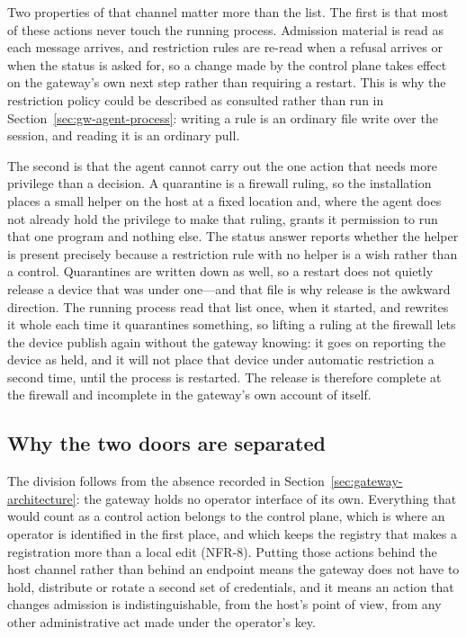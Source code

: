 \documentclass[12pt,a4paper]{report}
\begin{document}
Two properties of that channel matter more than the list. The first is
that most of these actions never touch the running process. Admission
material is read as each message arrives, and restriction rules are
re-read when a refusal arrives or when the status is asked for, so a
change made by the control plane takes effect on the gateway's own next
step rather than requiring a restart. This is why the restriction policy
could be described as consulted rather than run in
Section~\ref{sec:gw-agent-process}: writing a rule is an ordinary file
write over the session, and reading it is an ordinary pull.

The second is that the agent cannot carry out the one action that needs
more privilege than a decision. A quarantine is a firewall ruling, so
the installation places a small helper on the host at a fixed location
and, where the agent does not already hold the privilege to make that
ruling, grants it permission to run that one program and nothing else.
The status answer reports whether the helper is present precisely
because a restriction rule with no helper is a wish rather than a
control. Quarantines are written down as well, so a restart does not
quietly release a device that was under one---and that file is why
release is the awkward direction. The running process read that list
once, when it started, and rewrites it whole each time it quarantines
something, so lifting a ruling at the firewall lets the device publish
again without the gateway knowing: it goes on reporting the device as
held, and it will not place that device under automatic restriction a
second time, until the process is restarted. The release is therefore
complete at the firewall and incomplete in the gateway's own account of
itself.

\subsection{Why the two doors are separated}
\label{sec:gw-api-split}

The division follows from the absence recorded in
Section~\ref{sec:gateway-architecture}: the gateway holds no operator
interface of its own. Everything that would count as a control action
belongs to the control plane, which is where an operator is identified
in the first place, and which keeps the registry that makes a
registration more than a local edit (NFR-8). Putting those actions
behind the host channel rather than behind an endpoint means the
gateway does not have to hold, distribute or rotate a second set of
credentials, and it means an action that changes admission is
indistinguishable, from the host's point of view, from any other
administrative act made under the operator's key.
\end{document}
